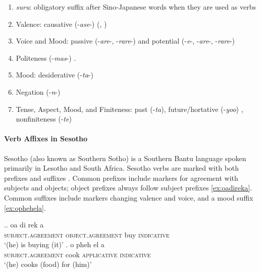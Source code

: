 \begin{enumerate}
\item \textit{suru}: obligatory suffix after Sino-Japanese words when they are used as verbs
\item Valence: causative (-\textit{ase}-) (\citet[142]{hasegawa2014japanese}, \citet[Chapter 13]{kaiser2013japanese})
\item Voice and Mood: passive (-\textit{are}-, -\textit{rare}-) \cite[152]{hasegawa2014japanese} \cite[Chapter 12]{kaiser2013japanese} and potential (-\textit{e}-, -\textit{are}-, -\textit{rare}-) \cite[398]{kaiser2013japanese}  
\item Politeness (-\textit{mas}-) \cite[190]{kaiser2013japanese}.
\item Mood: desiderative (-\textit{ta}-) \cite[238]{kaiser2013japanese}
\item Negation (-\textit{n}-)
\item Tense, Aspect, Mood, and Finiteness: past (-\textit{ta}), future/hortative (-\textit{yoo}) \cite[229]{kaiser2013japanese}, nonfiniteness (-\textit{te}) \cite[186]{kaiser2013japanese}
\end{enumerate}







\paragraph{Verb Affixes in Sesotho}
Sesotho (also known as Southern Sotho) is a Southern Bantu language spoken primarily in Lesotho and South Africa.
Sesotho verbs are marked with both prefixes and suffixes \citep{demuth1992acquisition}.
Common prefixes include markers for agreement with subjects and objects; object prefixes always follow subject prefixes \ref{ex:oadireka}.
Common suffixes include markers changing valence and voice, and a mood suffix \ref{ex:ophehela}.

\ex.\ag. oa di rek a \\
\textsc{subject.agreement} \textsc{object.agreement} buy \textsc{indicative} \\
`(he) is buying (it)'  \cite[ex (41)]{demuth1992acquisition} \label{ex:oadireka}
\bg. o pheh el a \\
\textsc{subject.agreement} cook \textsc{applicative} \textsc{indicative} \\
`(he) cooks (food) for (him)'  \cite[ex (41)]{demuth1992acquisition}
\label{ex:ophehela}

